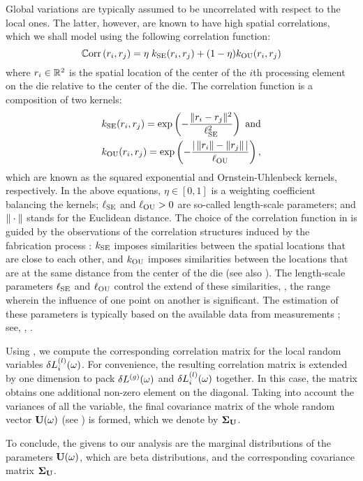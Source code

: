 Global variations are typically assumed to be uncorrelated with respect to the local ones.
The latter, however, are known to have high spatial correlations, which we shall model using the following correlation function:
\begin{equation} \elabel{correlation-function}
  \oCorr{\r_i, \r_j} = \eta \; \kernel_\SE(\r_i, \r_j) + (1 - \eta) \kernel_\OU(\r_i, \r_j)
\end{equation}
where $r_i \in \mathbb{R}^2$ is the spatial location of the center of the $i$th processing element on the die relative to the center of the die. The correlation function is a composition of two kernels:
\begin{align*}
  & k_{\text{SE}}(r_i, r_j) = \exp\left(-\frac{\| r_i - r_j \|^2}{\ell_{\text{SE}}^2}\right) \text{ and} \\
  & k_{\text{OU}}(r_i, r_j) = \exp\left(- \frac{| \,\| r_i \| - \| r_j \|\, |}{\ell_{\text{OU}}} \right),
\end{align*}
which are known as the squared exponential and Ornstein-Uhlenbeck kernels, respectively.
In the above equations, $\eta \in [0, 1]$ is a weighting coefficient balancing the kernels; $\ell_{\text{SE}}$ and $\ell_{\text{OU}} > 0$ are so-called length-scale parameters; and $\| \cdot \|$ stands for the Euclidean distance.
The choice of the correlation function in  is guided by the observations of the correlation structures induced by the fabrication process \cite{chandrakasan2001, friedberg2005, cheng2011}: $k_{\text{SE}}$ imposes similarities between the spatial locations that are close to each other, and $k_{\text{OU}}$ imposes similarities between the locations that are at the same distance from the center of the die (see also \cite{ghanem1991, ghanta2006}).
The length-scale parameters $\ell_{\text{SE}}$ and $\ell_{\text{OU}}$ control the extend of these similarities, \ie, the range wherein the influence of one point on another is significant. The estimation of these parameters is typically based on the available data from measurements \cite{ghanta2006}; see, \eg, \cite{friedberg2005}.

Using , we compute the corresponding correlation matrix for the local random variables $\delta L^{(l)}_i(\omega)$.
For convenience, the resulting correlation matrix is extended by one dimension to pack ${\delta L^{(g)}}(\omega)$ and $\delta L^{(l)}_i(\omega)$ together.
In this case, the matrix obtains one additional non-zero element on the diagonal.
Taking into account the variances of all the variable, the final covariance matrix of the whole random vector $\mathbf{U}(\omega)$ (see ) is formed, which we denote by $\mCov_\vU$.

To conclude, the givens to our analysis are the marginal distributions of the parameters $\mathbf{U}(\omega)$, which are beta distributions, and the corresponding covariance matrix $\mCov_\vU$.

